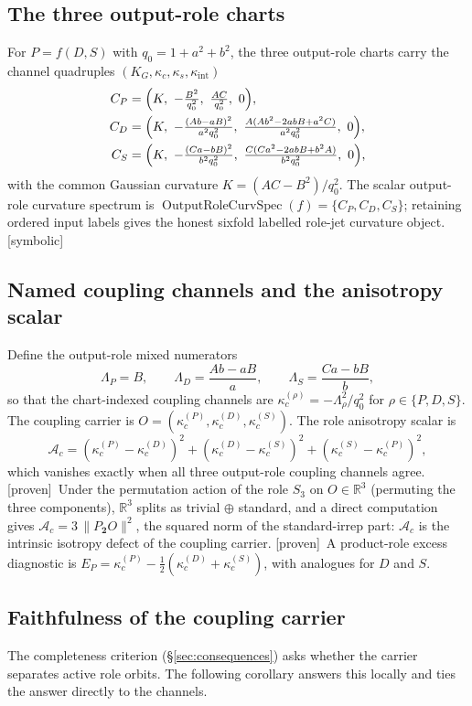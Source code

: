 \documentclass[11pt]{article}
\newcommand{\Proven}{\textsf{[proven]}}
\newcommand{\Symbolic}{\textsf{[symbolic]}}
\theoremstyle{plain}
\theoremstyle{definition}
\newcommand{\KG}{K_{G}}
\newcommand{\Ac}{\mathcal{A}_c}
\newcommand{\kc}{\kappa_{c}}
\newcommand{\kint}{\kappa_{\mathrm{int}}}
\newcommand{\ks}{\kappa_{s}}
\newcommand{\kcrole}[1]{\kappa_{c}^{(#1)}}   %
\begin{document}
\subsection{The three output-role charts}
For $P=f(D,S)$ with $q_0=1+a^2+b^2$, the three output-role charts carry the channel quadruples
$(\KG,\kc,\ks,\kint)$
\begin{align*}
C_P&=\Bigl(K,\ -\tfrac{B^2}{q_0^2},\ \tfrac{AC}{q_0^2},\ 0\Bigr),\\
C_D&=\Bigl(K,\ -\tfrac{(Ab-aB)^2}{a^2q_0^2},\ \tfrac{A(Ab^2-2abB+a^2C)}{a^2q_0^2},\ 0\Bigr),\\
C_S&=\Bigl(K,\ -\tfrac{(Ca-bB)^2}{b^2q_0^2},\ \tfrac{C(Ca^2-2abB+b^2A)}{b^2q_0^2},\ 0\Bigr),
\end{align*}
with the common Gaussian curvature $K=(AC-B^2)/q_0^2$. The scalar output-role curvature spectrum is
$\operatorname{OutputRoleCurvSpec}(f)=\{C_P,C_D,C_S\}$; retaining ordered input labels gives the
honest sixfold labelled role-jet curvature object. \Symbolic

\subsection{Named coupling channels and the anisotropy scalar}
Define the output-role mixed numerators
\[
\Lambda_P=B,\qquad
\Lambda_D=\frac{Ab-aB}{a},\qquad
\Lambda_S=\frac{Ca-bB}{b},
\]
so that the chart-indexed coupling channels are $\kcrole{\rho}=-\Lambda_\rho^2/q_0^2$ for
$\rho\in\{P,D,S\}$. The coupling carrier is $O=(\kcrole{P},\kcrole{D},\kcrole{S})$. The role anisotropy
scalar is
\[
\Ac=(\kcrole{P}-\kcrole{D})^2+(\kcrole{D}-\kcrole{S})^2+(\kcrole{S}-\kcrole{P})^2,
\]
which vanishes exactly when all three output-role coupling channels agree. \Proven\ Under the
permutation action of the role $S_3$ on $O\in\mathbb R^3$ (permuting the three components),
$\mathbb R^3$ splits as trivial $\oplus$ standard, and a direct computation gives
$\Ac=3\,\lVert P_{\mathbf 2}O\rVert^2$, the squared norm of the standard-irrep part: $\Ac$ is the
intrinsic isotropy defect of the coupling carrier. \Proven\ A product-role excess diagnostic is
$E_P=\kcrole{P}-\tfrac12(\kcrole{D}+\kcrole{S})$, with analogues for $D$ and $S$.

\subsection{Faithfulness of the coupling carrier}
\label{sec:faithful}
The completeness criterion (\S\ref{sec:consequences}) asks whether the carrier separates active role
orbits. The following corollary answers this locally and ties the answer directly to the channels.
\end{document}

